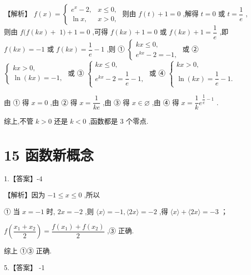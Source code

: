 \documentclass[10pt]{article}
\begin{document}
【解析】 $f\left( x\right)  = \left\{  \begin{array}{ll} {{e}}^{x} - 2, & x \leq  0, \\  \ln x, & x > 0, \end{array}\right.$ 则由 $f\left( t\right)  + 1 = 0$ ,解得 $t = 0$ 或 $t = \dfrac{1}{{e}}$ ,则由 $f(f\left( {kx}\right)  +$  $1) + 1 = 0$ ,可得 $f\left( {kx}\right)  + 1 = 0$ 或 $f\left( {kx}\right)  + 1 = \dfrac{1}{{e}}$ ,即 $f\left( {kx}\right)  =  - 1$ 或 $f\left( {kx}\right)  = \dfrac{1}{{e}} - 1$ ,则 ① $\left\{  \begin{array}{l} {kx} \leq  0, \\  {{e}}^{kx} - 2 =  - 1, \end{array}\right.$ 或 ② $\left\{  \begin{array}{l} {kx} > 0, \\  \ln \left( {kx}\right)  =  - 1, \end{array}\right.$ 或 ③ $\left\{  \begin{array}{l} {kx} \leq  0, \\  {{e}}^{kx} - 2 = \dfrac{1}{{e}} - 1, \end{array}\right.$ 或 ④ $\left\{  \begin{array}{l} {kx} > 0, \\  \ln \left( {kx}\right)  = \dfrac{1}{{e}} - 1. \end{array}\right.$

由 ① 得 $x = 0$ ,由 ② 得 $x = \dfrac{1}{k{e}}$ ,由 ③ 得 $x \in  \varnothing$ ,由 ④ 得 $x = \dfrac{1}{k}{{e}}^{\dfrac{1}{{e}} - 1}$ .

综上,不管 $k > 0$ 还是 $k < 0$ ,函数都是 3 个零点.

\section*{15 函数新概念}

1.【答案】-4

【解析】因为 $- 1 \leq  x \leq  0$ ,所以

① 当 $x =  - 1$ 时, ${2x} =  - 2$ ,则 $\langle x\rangle  =  - 1,\langle {2x}\rangle  =  - 2$ ,得 $\langle x\rangle  + \langle {2x}\rangle  =  - 3$ ；

$f\left( \dfrac{{x}_{1} + {x}_{2}}{2}\right)  = \dfrac{f\left( {x}_{1}\right)  + f\left( {x}_{2}\right) }{2}$ ,③ 正确.

综上 ①③ 正确.

5.【答案】 -1
\end{document}
